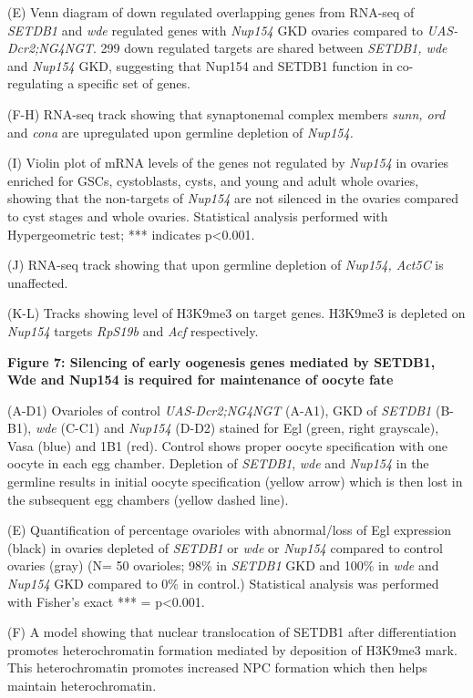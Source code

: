\documentclass[12pt,oneside]{reedthesis}
\begin{document}
(E) Venn diagram of down regulated overlapping genes from RNA-seq of
\emph{SETDB1} and \emph{wde} regulated genes with \emph{Nup154} GKD ovaries compared to
\emph{UAS-Dcr2;NG4NGT}. 299 down regulated targets are shared between
\emph{SETDB1, wde} and \emph{Nup154} GKD, suggesting that Nup154 and SETDB1
function in co-regulating a specific set of genes.

(F-H) RNA-seq track showing that synaptonemal complex members \emph{sunn,
ord} and \emph{cona} are upregulated upon germline depletion of \emph{Nup154.}

(I) Violin plot of mRNA levels of the genes not regulated by \emph{Nup154} in
ovaries enriched for GSCs, cystoblasts, cysts, and young and adult whole
ovaries, showing that the non-targets of \emph{Nup154} are not silenced in
the ovaries compared to cyst stages and whole ovaries. Statistical
analysis performed with Hypergeometric test; *** indicates p\textless0.001.

(J) RNA-seq track showing that upon germline depletion of \emph{Nup154,
Act5C} is unaffected.

(K-L) Tracks showing level of H3K9me3 on target genes. H3K9me3 is
depleted on \emph{Nup154} targets \emph{RpS19b} and \emph{Acf} respectively.

\textbf{Figure 7: Silencing of early oogenesis genes mediated by SETDB1, Wde
and Nup154 is required for maintenance of oocyte fate}

(A-D1) Ovarioles of control \emph{UAS-Dcr2;NG4NGT} (A-A1), GKD of \emph{SETDB1}
(B-B1), \emph{wde} (C-C1) and \emph{Nup154} (D-D2) stained for Egl (green, right
grayscale), Vasa (blue) and 1B1 (red). Control shows proper oocyte
specification with one oocyte in each egg chamber. Depletion of
\emph{SETDB1}, \emph{wde} and \emph{Nup154} in the germline results in initial oocyte
specification (yellow arrow) which is then lost in the subsequent egg
chambers (yellow dashed line).

(E) Quantification of percentage ovarioles with abnormal/loss of Egl
expression (black) in ovaries depleted of \emph{SETDB1} or \emph{wde} or \emph{Nup154}
compared to control ovaries (gray) (N= 50 ovarioles; 98\% in \emph{SETDB1} GKD
and 100\% in \emph{wde} and \emph{Nup154} GKD compared to 0\% in control.)
Statistical analysis was performed with Fisher's exact *** =
p\textless0.001.

(F) A model showing that nuclear translocation of SETDB1 after
differentiation promotes heterochromatin formation mediated by
deposition of H3K9me3 mark. This heterochromatin promotes increased NPC
formation which then helps maintain heterochromatin.
\end{document}
